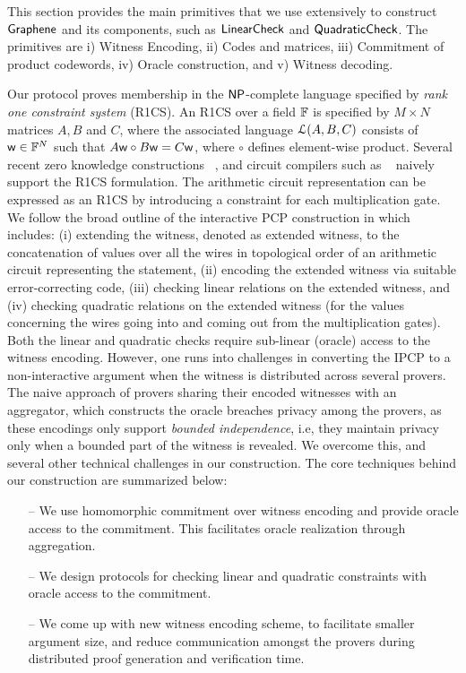 This section provides the main primitives that we use extensively to construct $\textsf{Graphene}$ and its components, such as $\mathsf{LinearCheck}$ and $\mathsf{QuadraticCheck}$. The primitives are i) Witness Encoding, ii) Codes and matrices, iii) Commitment of product codewords, iv) Oracle construction, and v) Witness decoding.

Our protocol proves membership in the $\mathsf{NP}$-complete language specified by {\em rank one constraint system} (R1CS). An R1CS over a field $\mathbb{F}$ is specified by $M\times N$ matrices $A,B$ and $C$, where the associated language $\mathcal{L}(A,B,C)$ consists of $\mathsf{w}\in \mathbb{F}^N$ such that $A\mathsf{w}\circ B\mathsf{w}=C\mathsf{w}$, where $\circ$ defines element-wise product. Several
recent zero knowledge constructions ~\cite{Groth16,aurora,marlin}, and circuit compilers such as ~\cite{zokrates} naively support the R1CS formulation. 
The arithmetic circuit representation can be expressed as an R1CS by introducing a constraint for each multiplication gate. We follow the broad outline of the interactive PCP
construction in \cite{ligero} which includes: (i) extending the witness, denoted as extended witness, to the concatenation of values over all the wires in topological order of an arithmetic circuit representing the statement, (ii) encoding the extended witness via suitable error-correcting code, (iii) checking linear relations on the extended witness, and (iv) checking quadratic relations on the extended witness  (for the values concerning the wires going into and coming out from the multiplication gates). Both the linear and quadratic checks require sub-linear (oracle) access to the witness encoding.
However, one runs into challenges in converting the IPCP to a non-interactive argument when the witness is distributed across several provers. The naive approach of provers sharing their encoded witnesses with an aggregator, which constructs the oracle breaches privacy among the provers, as these encodings only support {\em bounded independence}, i.e, they maintain privacy only when a bounded part of the witness is revealed. We overcome this, and several other technical challenges in our construction. The core techniques behind our
construction are summarized below:
\begin{itemize}
	\item[--] We use homomorphic commitment over witness encoding and provide oracle access to the commitment. This facilitates oracle realization through aggregation.
	\item[--] We design protocols for checking linear and quadratic constraints with oracle access to the commitment.
	\item[--] We come up with new witness encoding scheme, to facilitate smaller argument size, and reduce communication amongst the provers during distributed proof generation and verification time.
\end{itemize}
